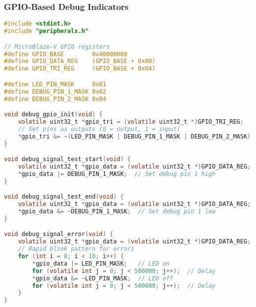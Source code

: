 \documentclass{beamer}
\begin{document}
\begin{frame}[fragile]
\frametitle{GPIO-Based Debug Indicators}
\begin{lstlisting}[language=C, basicstyle=\fontsize{5}{2}\selectfont\ttfamily, backgroundcolor={}]
#include <stdint.h>
#include "peripherals.h"

// MicroBlaze-V GPIO registers
#define GPIO_BASE        0x40000000
#define GPIO_DATA_REG    (GPIO_BASE + 0x00)
#define GPIO_TRI_REG     (GPIO_BASE + 0x04)

#define LED_PIN_MASK     0x01
#define DEBUG_PIN_1_MASK 0x02
#define DEBUG_PIN_2_MASK 0x04

void debug_gpio_init(void) {
    volatile uint32_t *gpio_tri = (volatile uint32_t *)GPIO_TRI_REG;
    // Set pins as outputs (0 = output, 1 = input)
    *gpio_tri &= ~(LED_PIN_MASK | DEBUG_PIN_1_MASK | DEBUG_PIN_2_MASK);
}

void debug_signal_test_start(void) {
    volatile uint32_t *gpio_data = (volatile uint32_t *)GPIO_DATA_REG;
    *gpio_data |= DEBUG_PIN_1_MASK;  // Set debug pin 1 high
}

void debug_signal_test_end(void) {
    volatile uint32_t *gpio_data = (volatile uint32_t *)GPIO_DATA_REG;
    *gpio_data &= ~DEBUG_PIN_1_MASK;  // Set debug pin 1 low
}

void debug_signal_error(void) {
    volatile uint32_t *gpio_data = (volatile uint32_t *)GPIO_DATA_REG;
    // Rapid blink pattern for errors
    for (int i = 0; i < 10; i++) {
        *gpio_data |= LED_PIN_MASK;   // LED on
        for (volatile int j = 0; j < 500000; j++);  // Delay
        *gpio_data &= ~LED_PIN_MASK;  // LED off
        for (volatile int j = 0; j < 500000; j++);  // Delay
    }
}
\end{lstlisting}
\end{frame}
\end{document}
